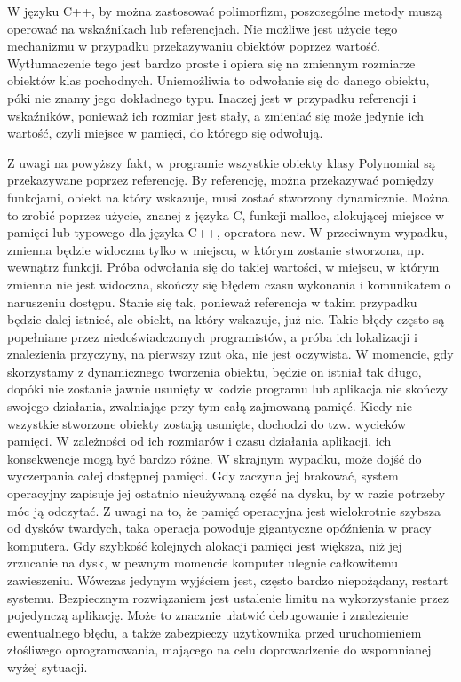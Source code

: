 \documentclass[twoside,a4paper]{book}
\begin{document}
W języku C++, by można zastosować polimorfizm, poszczególne metody muszą operować na wskaźnikach lub referencjach. Nie możliwe jest użycie tego mechanizmu w przypadku przekazywaniu obiektów poprzez wartość. Wytłumaczenie tego jest bardzo proste i opiera się na zmiennym rozmiarze obiektów klas pochodnych. Uniemożliwia to odwołanie się do danego obiektu, póki nie znamy jego dokładnego typu. Inaczej jest w przypadku referencji i wskaźników, ponieważ ich rozmiar jest stały, a zmieniać się może jedynie ich wartość, czyli miejsce w pamięci, do którego się odwołują.

Z uwagi na powyższy fakt, w programie wszystkie obiekty klasy Polynomial są przekazywane poprzez referencję. By referencję, można przekazywać pomiędzy funkcjami, obiekt na który wskazuje, musi zostać stworzony dynamicznie. Można to zrobić poprzez użycie, znanej z języka C, funkcji malloc, alokującej miejsce w pamięci lub typowego dla języka C++, operatora new. W przeciwnym wypadku, zmienna będzie widoczna tylko w miejscu, w którym zostanie stworzona, np. wewnątrz funkcji. Próba odwołania się do takiej wartości, w miejscu, w którym zmienna nie jest widoczna, skończy się błędem czasu wykonania i komunikatem o naruszeniu dostępu. Stanie się tak, ponieważ referencja w takim przypadku będzie dalej istnieć, ale obiekt, na który wskazuje, już nie. Takie błędy często są popełniane przez niedoświadczonych programistów, a próba ich lokalizacji i znalezienia przyczyny, na pierwszy rzut oka, nie jest oczywista. W momencie, gdy skorzystamy z dynamicznego tworzenia obiektu, będzie on istniał tak długo, dopóki nie zostanie jawnie usunięty w kodzie programu lub aplikacja nie skończy swojego działania, zwalniając przy tym całą zajmowaną pamięć. Kiedy nie wszystkie stworzone obiekty zostają usunięte, dochodzi do tzw. wycieków pamięci. W zależności od ich rozmiarów i czasu działania aplikacji, ich konsekwencje mogą być bardzo różne. W skrajnym wypadku, może dojść do wyczerpania całej dostępnej pamięci. Gdy zaczyna jej brakować, system operacyjny zapisuje jej ostatnio nieużywaną część na dysku, by w razie potrzeby móc ją odczytać. Z uwagi na to, że pamięć operacyjna jest wielokrotnie szybsza od dysków twardych, taka operacja powoduje gigantyczne opóźnienia w pracy komputera. Gdy szybkość kolejnych alokacji pamięci jest większa, niż jej zrzucanie na dysk, w pewnym momencie komputer ulegnie całkowitemu zawieszeniu. Wówczas jedynym wyjściem jest, często bardzo niepożądany, restart systemu. Bezpiecznym rozwiązaniem jest ustalenie limitu na wykorzystanie przez pojedynczą aplikację. Może to znacznie ułatwić debugowanie i znalezienie ewentualnego błędu, a także zabezpieczy użytkownika przed uruchomieniem złośliwego oprogramowania, mającego na celu doprowadzenie do wspomnianej wyżej sytuacji.
\end{document}
